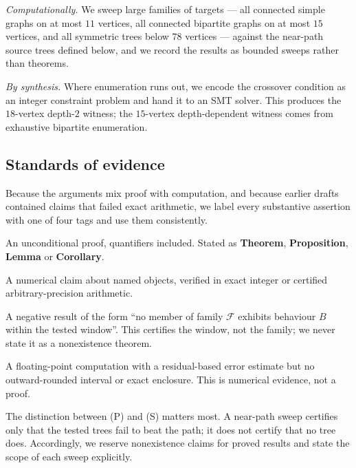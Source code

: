 \emph{Computationally.} We sweep large families of targets --- all
connected simple graphs on at most $11$ vertices, all connected
bipartite graphs on at most $15$ vertices, and all symmetric trees
below $78$ vertices --- against the near-path source trees defined
below, and we record the results as bounded sweeps rather than theorems.

\emph{By synthesis.} Where enumeration runs out, we encode the
crossover condition as an integer constraint problem and hand it to an
SMT solver. This produces the $18$-vertex depth-$2$ witness; the
$15$-vertex depth-dependent witness comes from exhaustive bipartite
enumeration.

\subsection{Standards of evidence}
\label{sec:evidence}

Because the arguments mix proof with computation, and because earlier
drafts contained claims that failed exact arithmetic, we label every
substantive assertion with one of four tags and use them consistently.

\begin{description}[leftmargin=2.4em,style=nextline,font=\normalfont\bfseries]
  \item[(P) Proved.] An unconditional proof, quantifiers included.
    Stated as \textbf{Theorem}, \textbf{Proposition}, \textbf{Lemma} or
    \textbf{Corollary}.
  \item[(E) Exact finite computation.] A numerical claim about named
    objects, verified in exact integer or certified
    arbitrary-precision arithmetic.
  \item[(S) Bounded sweep.] A negative result of the form ``no member
    of family $\mathcal{F}$ exhibits behaviour $B$ within the tested
    window''. This certifies the window, not the family; we never state it as a
    nonexistence theorem.
  \item[(N) High-precision numerics.] A floating-point computation with
    a residual-based error estimate but no outward-rounded interval or
    exact enclosure. This is numerical evidence, not a proof.
\end{description}

The distinction between (P) and (S) matters most. A near-path sweep
certifies only that the tested trees fail to beat the path; it does not
certify that no tree does. Accordingly, we reserve nonexistence claims
for proved results and state the scope of each sweep explicitly.

